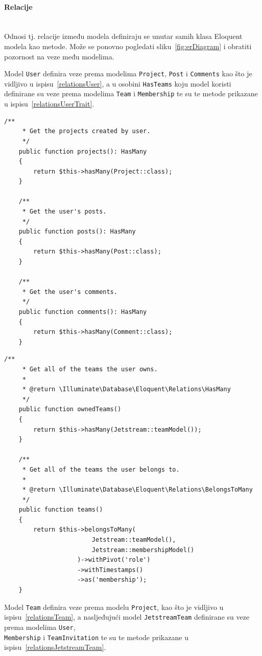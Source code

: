 \paragraph{Relacije}
\label{paragraph:relations}\mbox{}\\
\indent Odnosi tj. relacije između modela definiraju se unutar samih klasa Eloquent modela kao metode. Može se ponovno pogledati sliku~\ref{fig:erDiagram} i obratiti pozornost na veze među modelima.

Model \texttt{User} definira veze prema modelima \texttt{Project}, \texttt{Post} i \texttt{Comments} kao što je vidljivo u ispisu~\ref{relationsUser}, a u osobini \texttt{HasTeams} koju model koristi definirane su veze prema modelima \texttt{Team} i \texttt{Membership} te su te metode prikazane u ispisu~\ref{relationsUserTrait}.

\begin{lstlisting}[caption={Relacije modela \texttt{User}}, label=relationsUser]
    /**
     * Get the projects created by user.
     */
    public function projects(): HasMany
    {
        return $this->hasMany(Project::class);
    }

    /**
     * Get the user's posts.
     */
    public function posts(): HasMany
    {
        return $this->hasMany(Post::class);
    }

    /**
     * Get the user's comments.
     */
    public function comments(): HasMany
    {
        return $this->hasMany(Comment::class);
    }
\end{lstlisting}

\begin{lstlisting}[caption={Relacije modela \texttt{User} koje koristi iz osobine \texttt{HasTeams}}, label=relationsUserTrait]
    /**
     * Get all of the teams the user owns.
     *
     * @return \Illuminate\Database\Eloquent\Relations\HasMany
     */
    public function ownedTeams()
    {
        return $this->hasMany(Jetstream::teamModel());
    }

    /**
     * Get all of the teams the user belongs to.
     *
     * @return \Illuminate\Database\Eloquent\Relations\BelongsToMany
     */
    public function teams()
    {
        return $this->belongsToMany(
                        Jetstream::teamModel(), 
                        Jetstream::membershipModel()
                    )->withPivot('role')
                    ->withTimestamps()
                    ->as('membership');
    }
\end{lstlisting}

Model \texttt{Team} definira veze prema modelu \texttt{Project}, kao što je vidljivo u ispisu~\ref{relationsTeam}, a nasljeđujući model \texttt{JetstreamTeam} definirane su veze prema modelima \texttt{User}, \\ \texttt{Membership} i \texttt{TeamInvitation} te su te metode prikazane u ispisu~\ref{relationsJetstreamTeam}.

